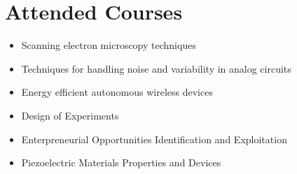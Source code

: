 \section{Attended Courses}
\begin{itemize}
	\item Scanning electron microscopy techniques
	\item Techniques for handling noise and variability in analog circuits
	\item Energy efficient autonomous wireless devices
	\item Design of Experiments
	\item Enterpreneurial Opportunities Identification and Exploitation
	\item Piezoelectric Materials Properties and Devices
\end{itemize}